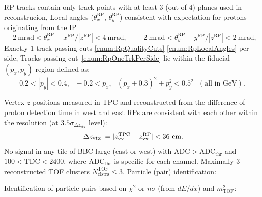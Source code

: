 \begin{enumerate}[label=\textbf{C\arabic*},ref=C\arabic*]
      \begin{enumerate}[label=\textbf{\theenumi.\arabic*},ref=\theenumi.\arabic*]
      \itemm RP tracks contain only track-points with at least 3 (out of 4) planes used in reconstrucion,\label{enum:RpQualityCuts}
      \itemm Local angles ($\theta_{x}^{\text{RP}}$, $\theta_{y}^{\text{RP}}$) consistent with expectation for protons originating from the IP\label{enum:RpLocalAngles}%
      \[-2~\text{mrad}<\theta_{x}^{\text{RP}}-x^{\text{RP}}/|z^{\text{RP}}|<4~\text{mrad},~~~~~-2~\text{mrad}<\theta_{y}^{\text{RP}}-y^{\text{RP}}/|z^{\text{RP}}|<2~\text{mrad},\]
      \itemm Exactly 1 track passing cuts \ref{enum:RpQualityCuts}-\ref{enum:RpLocalAngles} per side,\label{enum:RpOneTrkPerSide}
      \itemm Tracks passing cut~\ref{enum:RpOneTrkPerSide} lie within the fiducial $(p_{x},p_{y})$ region defined as\label{enum:RpFiducial}:\\
      \[0.2<|p_{y}|<0.4,~~~-0.2<p_{x},~~~(p_{x}+0.3)^{2}+p_{y}^{2}<0.5^{2}~~~(\text{all in GeV}).\]
    \end{enumerate}
 \itemm Vertex $z$-positions measured in TPC and reconstructed from the difference of proton detection time in west and east RPs are consistent with each other within the resolution (at $3.5\sigma_{\Delta z_{\text{vtx}}}$ level):
 \[|\Delta z_{\text{vtx}}| = |z_{\text{vx}}^{\text{TPC}}-z_{\text{vx}}^{\text{RP}}|<36~\text{cm}.\vspace{-17pt}\]\label{enum:CutDeltaZVx}
 \itemm No signal in any tile of BBC-large (east or west) with $\text{ADC}>\text{ADC}_{\text{thr}}$ and $100<\text{TDC}<2400$, where $\text{ADC}_{\text{thr}}$ is specific for each channel.\label{enum:CutBbcLarge}%
 \itemm Maximally 3 reconstructed TOF clusters $N^{\text{TOF}}_{\text{clstrs}}\leq 3$.\label{enum:CutTofClusters}%
 \itemm Particle (pair) identification:\label{enum:CutPid}
 \begin{enumerate}[label=\textbf{\theenumi.\arabic*},ref=\theenumi.\arabic*]
      \itemm Identification of particle pairs based on $\chi^{2}$ or $n\sigma$ (from $dE/dx$) and $m^{2}_{\text{TOF}}$:\label{enum:CutPidNoPtLimit}\\[3pt]

\end{enumerate}
\end{enumerate}
